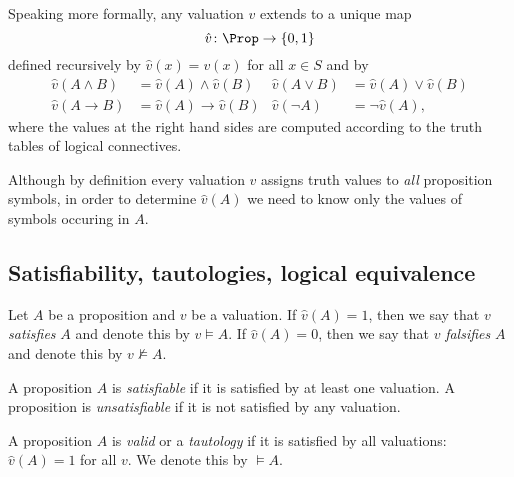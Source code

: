 \begin{page}
\setcounter{section}{1}
\setcounter{subsection}{3}
\setcounter{dfn}{3}
\label{portion:359}


Speaking more formally, any valuation $v$ extends to a unique map
\[
\hat{v} \colon \Prop \to \{0,1\}
\]
defined recursively by $\hat{v}(x) = v(x)$ for all $x \in S$ and by
\begin{align*}
\hat{v}(A \wedge B) &= \hat{v}(A) \wedge \hat{v}(B) & \hat{v}(A \vee B) &= \hat{v}(A) \vee \hat{v}(B)\\
\hat{v}(A \to B) &= \hat{v}(A) \to \hat{v}(B) & \hat{v}(\neg A) &= \neg \hat{v}(A),
\end{align*}
where the values at the right hand sides are computed according to the truth tables of logical connectives.

Although by definition every valuation $v$ assigns truth values to \emph{all} proposition symbols,
in order to determine $\hat{v}(A)$ we need to know only the values of symbols occuring in $A$.



\end{page}

\begin{page}
\setcounter{section}{1}
\setcounter{subsection}{3}
\setcounter{dfn}{3}
\label{portion:360}

\subsection{Satisfiability, tautologies, logical equivalence}

\end{page}

\begin{page}
\setcounter{section}{1}
\setcounter{subsection}{3}
\setcounter{dfn}{4}
\label{portion:362}

\begin{dfn}
Let $A$ be a proposition and $v$ be a valuation.
If $\hat{v}(A) = 1$, then we say that $v$ \emph{satisfies} $A$ and denote this by $v \vDash A$.
If $\hat{v}(A) = 0$, then we say that $v$ \emph{falsifies} $A$ and denote this by $v \nvDash A$.
\end{dfn}

\end{page}

\begin{page}
\setcounter{section}{1}
\setcounter{subsection}{3}
\setcounter{dfn}{5}
\label{portion:365}

\begin{dfn}
A proposition $A$ is \emph{satisfiable} if it is satisfied by at least one valuation.
A proposition is \emph{unsatisfiable} if it is not satisfied by any valuation.

A proposition $A$ is \emph{valid} or a \emph{tautology} if it is satisfied by all valuations: $\hat{v}(A) = 1$ for all $v$.
We denote this by $\vDash A$.
\end{dfn}

\end{page}


